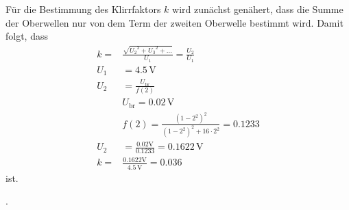 Für die Bestimmung des Klirrfaktors $k$ wird zunächst genähert, dass die Summe der
Oberwellen nur von dem Term der zweiten Oberwelle bestimmt wird. Damit folgt, dass
\begin{align}
  k = & \frac{\sqrt{{U_2}^2 + {U_3}^2 + ...}}{U_1} = \frac{U_2}{U_1}  \\
  U_1 & = 4.5 \, \text{V}    \\
  U_2 & = \frac{U_\text{br}}{f(2)}    \\
      & U_\text{br} = 0.02 \, \text{V}   \\
      & f(2) = \frac{(1 - 2^2)^2}{(1 - 2^2)^2 + 16 \cdot 2^2} = 0.1233  \\
  U_2 & = \frac{0.02 \text{V}}{0.1233} = 0.1622 \, \text{V}  \\
  k = & \frac{0.1622 \text{V}}{4.5 \, \text{V}} = 0.036
\end{align}
ist.








.
